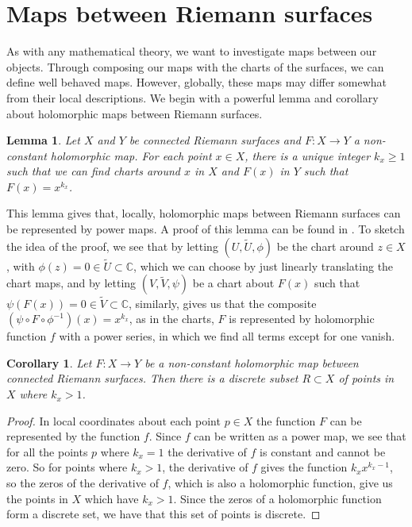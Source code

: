 \documentclass[11pt]{report}
\newtheorem{lemma}[thm]{Lemma}
\newtheorem{cor}[thm]{Corollary}
\theoremstyle{definition}
\newenvironment{sproof}{%
  \renewcommand{\proofname}{Sketch Proof}\proof}{\endproof}
\begin{document}
\section{Maps between Riemann surfaces}
As with any mathematical theory, we want to investigate maps between our objects. Through composing our maps with the charts of the surfaces, we can define well behaved maps. However, globally, these maps may differ somewhat from their local descriptions. 
We begin with a powerful lemma and corollary about holomorphic maps between Riemann surfaces.
\begin{lemma}
  Let $X$ and $Y$ be connected Riemann surfaces and $F:X \rightarrow Y$ a non-constant holomorphic map. For each point $x \in X$, there is a unique integer $k_x \geq 1$ such that we can find charts around $x$ in $X$ and $F(x)$ in $Y$ such that $F(x) = x^{k_x}$.
\end{lemma}
\begin{sproof}
  This lemma gives that, locally, holomorphic maps between Riemann surfaces can be represented by power maps. A proof of this lemma can be found in \cite[Proposition 5]{donaldson}. To sketch the idea of the proof, we see that by letting $(U,\widetilde{U},\phi)$ be the chart around $z \in X$, with $\phi(z)=0\in \widetilde{U} \subset \mathbb{C}$, which we can choose by just linearly translating the chart maps, and by letting $(V,\widetilde{V},\psi)$ be a chart about $F(x)$ such that $\psi(F(x)) = 0 \in \widetilde{V} \subset \mathbb{C}$, similarly, gives us that the composite $(\psi \circ F \circ \phi^{-1})(x)=x^{k_x}$, as in the charts, $F$ is represented by holomorphic function $f$ with a power series, in which we find all terms except for one vanish.
\end{sproof}
\begin{cor}
  Let $F:X \rightarrow Y$ be a non-constant holomorphic map between connected Riemann surfaces. Then there is a discrete subset $R \subset X$ of points in $X$ where $k_x > 1$.
\end{cor}
\begin{proof}
  In local coordinates about each point $p \in X$ the function $F$ can be represented by the function $f$. Since $f$ can be written as a power map, we see that for all the points $p$ where $k_x = 1$ the derivative of $f$ is constant and cannot be zero. So for points where $k_x > 1$, the derivative of $f$ gives the function $k_xx^{k_x-1}$, so the zeros of the derivative of $f$, which is also a holomorphic function, give us the points in $X$ which have $k_x > 1$. Since the zeros of a holomorphic function form a discrete set, we have that this set of points is discrete.
\end{proof}
\end{document}
